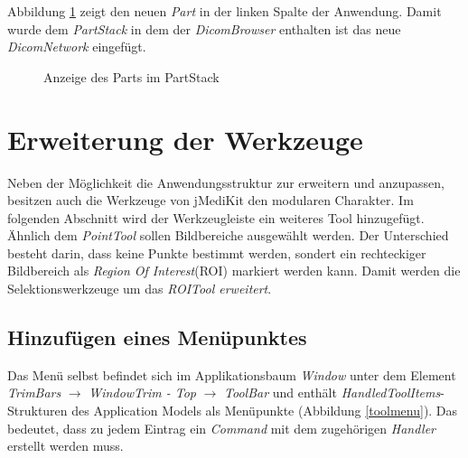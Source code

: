 Abbildung \ref{partfinal} zeigt den neuen \textit{Part} in der linken Spalte der Anwendung. Damit wurde dem \textit{PartStack} in dem der \textit{DicomBrowser} enthalten ist das neue \textit{DicomNetwork} eingefügt.

\begin{figure}[H]
  \vspace{0.5cm}
  \centering
   \caption{Anzeige des Parts im PartStack}
  \label{partfinal}
  \vspace{0.5cm}
\end{figure}

\section{Erweiterung der Werkzeuge} \label{roitool}
Neben der Möglichkeit die Anwendungsstruktur zur erweitern und anzupassen, besitzen auch die Werkzeuge von jMediKit den modularen Charakter.
Im folgenden Abschnitt wird der Werkzeugleiste ein weiteres Tool hinzugefügt. Ähnlich dem \textit{PointTool} sollen Bildbereiche ausgewählt werden. Der Unterschied besteht darin, dass keine Punkte bestimmt werden, sondert ein rechteckiger Bildbereich als \textit{Region Of Interest}(ROI) markiert werden kann. Damit werden die Selektionswerkzeuge um das \textit{ROITool erweitert}.\\

\subsection{Hinzufügen eines Menüpunktes} 
Das Menü selbst befindet sich im Applikationsbaum \textit{Window} unter dem Element \textit{TrimBars} $\rightarrow$ \textit{WindowTrim - Top} $\rightarrow$ \textit{ToolBar} und enthält \textit{HandledToolItems}-Strukturen des Application Models als Menüpunkte (Abbildung \ref{toolmenu}). Das bedeutet, dass zu jedem Eintrag ein \textit{Command} mit dem zugehörigen \textit{Handler} erstellt werden muss.

